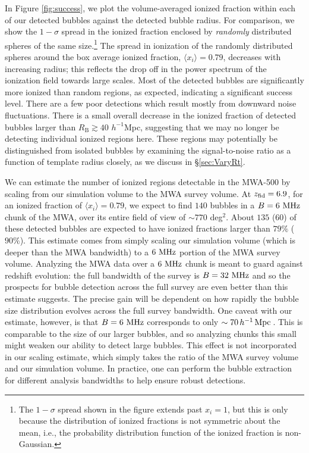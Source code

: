 In Figure \ref{fig:success}, we plot the volume-averaged ionized fraction within each of our
detected bubbles against
the detected bubble radius. For comparison, we show
the $1-\sigma$ spread in the ionized fraction enclosed by {\em randomly} distributed
spheres of the same size.\footnote{The $1-\sigma$ spread shown in the figure extends past $x_i = 1$, but this is only because the distribution of ionized fractions is not symmetric about the mean, i.e., the probability
distribution function of the ionized fraction is non-Gaussian.} The spread in ionization of the randomly distributed spheres around
the box average ionized fraction, $\langle x_i \rangle = 0.79$, decreases with increasing radius; this
reflects the drop off in the power spectrum of the ionization field towards large scales.
Most of the detected bubbles 
are significantly more ionized than random regions, as expected, indicating
a significant success level. There are a few poor detections which result mostly from
downward noise fluctuations. There is a small overall decrease in the ionized
fraction of detected bubbles larger than $R_{\text{B}} \gtrsim 40$ $h^{-1}$Mpc, suggesting that
we may no longer be detecting individual ionized regions here. These
regions may potentially be distinguished from isolated bubbles by examining
the signal-to-noise ratio as a function of template radius closely, as
we discuss in \S\ref{sec:VaryRt}.

We can estimate the number of ionized regions detectable in the MWA-500
by scaling from our simulation volume to the MWA survey volume.
At $z_{\rm fid} = 6.9$, for an ionized fraction of $\langle x_i \rangle = 0.79$,
we expect to find $140$ bubbles in a $B=6 \ \text{MHz}$ chunk of the
MWA, over its entire field of view of $\sim 770$ deg$^2$.
About $135$ ($60$) of these detected bubbles are expected to
have ionized fractions larger than $79\%$ ($90\%$). 
This estimate
comes from simply scaling our simulation volume (which is deeper
than the MWA bandwidth) to a $6 \ \text{MHz}$ portion of the MWA survey volume. 
Analyzing the MWA data over a $6 \ \text{MHz}$ 
chunk is meant to guard against redshift evolution: the full bandwidth
of the survey is $B = 32 \ \text{MHz}$ and so the prospects for bubble detection
across the full survey are even better than this estimate suggests.
The precise gain will be dependent on how rapidly the bubble size distribution
evolves across the full survey bandwidth. One caveat with our estimate, however,
is that $B=6 \ \text{MHz}$ corresponds to only $\sim 70\,h^{-1}\,{\rm Mpc}\,$. This is comparable
to the size of our larger bubbles, and so analyzing chunks this small
might weaken our ability to detect large bubbles. This effect
is not incorporated in our scaling estimate, which simply
takes the ratio of the MWA survey volume and our simulation volume.
In practice, one can perform the bubble extraction for different
analysis bandwidths to help ensure robust detections.



